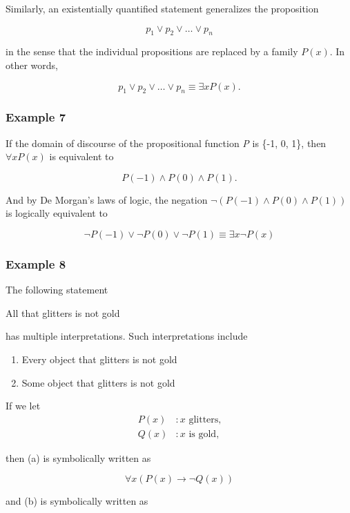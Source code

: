 Similarly, an existentially quantified statement generalizes the proposition

\[
    p_1 \vee p_2 \vee \dots \vee p_n
\]

in the sense that the individual propositions are replaced by a family $P(x)$.  In other words,

\[
    p_1 \vee p_2 \vee \dots \vee p_n \equiv \exists x P(x).
\]

\subsubsection{Example 7}

If the domain of discourse of the propositional function \textit{P} is \{-1, 0, 1\}, then $\forall x P(x)$ is equivalent to

\[
    P(-1) \land P(0) \land P(1).
\]

And by De Morgan's laws of logic, the negation $\lnot(P(-1) \land P(0) \land P(1))$ is logically equivalent to

\[
    \lnot P(-1) \vee \lnot P(0) \vee \lnot P(1) \equiv \exists x \lnot P(x)
\]

\subsubsection{Example 8}

The following statement

\begin{center}
    All that glitters is not gold
\end{center}

has multiple interpretations.  Such interpretations include

\begin{enumerate}[label=(\alph*)]
\item Every object that glitters is not gold
\item Some object that glitters is not gold
\end{enumerate}

If we let
\begin{align*}
    P(x)&: x \text{ glitters,}\\
    Q(x)&: x \text{ is gold,}
\end{align*}

then (a) is symbolically written as

\[
    \forall x (P(x) \rightarrow \lnot Q(x))
\]

and (b) is symbolically written as

